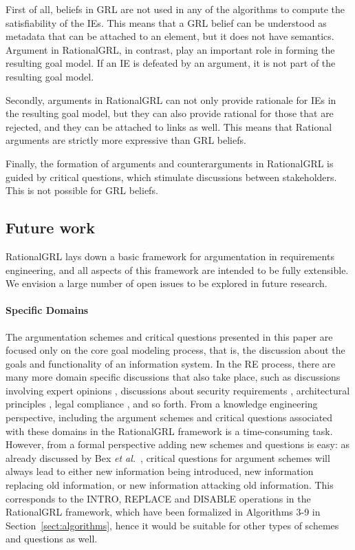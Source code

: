 First of all, beliefs in GRL are not used in any of the algorithms to compute the satisfiability of the IEs. This means that a GRL belief can be understood as metadata that can be attached to an element, but it does not have semantics. Argument in RationalGRL, in contrast, play an important role in forming the resulting goal model. If an IE is defeated by an argument, it is not part of the resulting goal model. 

Secondly, arguments in RationalGRL can not only provide rationale for IEs in the resulting goal model, but they can also provide rational for those that are rejected, and they can be attached to links as well. This means that Rational arguments are strictly more expressive than GRL beliefs.

Finally, the formation of arguments and counterarguments in RationalGRL is guided by critical questions, which stimulate discussions between stakeholders. This is not possible for GRL beliefs.

\subsection{Future work}
\label{sect:discussion:futurework}

RationalGRL lays down a basic framework for argumentation in requirements engineering, and all aspects of this framework are intended to be fully extensible. We envision a large number of open issues to be explored in future research.

\paragraph{Specific Domains}
The argumentation schemes and critical questions presented in this paper are focused only on the core goal modeling process, that is, the discussion about the goals and functionality of an information system. In the RE process, there are many more domain specific discussions that also take place, such as discussions involving expert opinions \cite{murukannaiah2015}, discussions about security requirements \cite{haley2008security,yu2015automated,ionita2014argumentation}, architectural principles \cite{marosin-etal:caise2016}, legal compliance \cite{Ghanavati2013}, and so forth. From a knowledge engineering perspective, including the argument schemes and critical questions associated with these domains in the RationalGRL framework is a time-consuming task. However, from a formal perspective adding new schemes and questions is easy: as already discussed by Bex \emph{et al.}~\cite{bexEtal2003}, critical questions for argument schemes will always lead to either new information being introduced, new information replacing old information, or new information attacking old information. This corresponds to the \textsf{INTRO}, \textsf{REPLACE} and \textsf{DISABLE} operations in the RationalGRL framework, which have been formalized in Algorithms 3-9 in Section~\ref{sect:algorithms}, hence it would be suitable for other types of schemes and questions as well.

